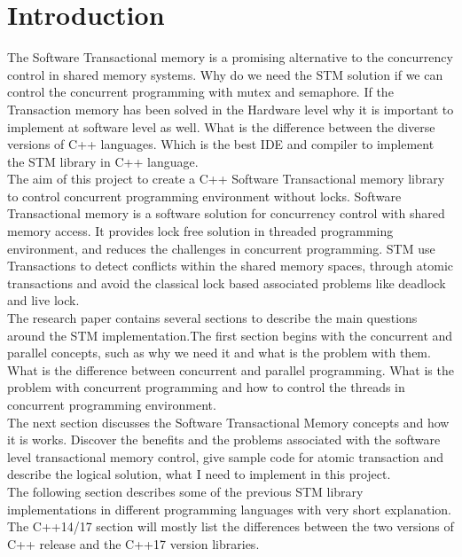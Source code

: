 \documentclass[12pt]{article}
\begin{document}
\section{Introduction}
The Software Transactional memory is a promising alternative to the concurrency control in shared memory systems. Why do we need the STM solution if we can control the concurrent programming with mutex and semaphore. If the Transaction memory has been solved in the Hardware level why it is important to implement at software level as well. What is the difference between the diverse versions of C++ languages. Which is the best IDE and compiler to implement the STM library in C++ language.\\

The aim of this project to create a C++ Software Transactional memory library to control concurrent programming environment without locks. Software Transactional memory is a software solution for concurrency control with shared memory access. It provides lock free solution in threaded programming environment, and reduces the challenges in concurrent programming. STM use Transactions to detect conflicts within the shared memory spaces, through atomic transactions and avoid the classical lock based associated problems like deadlock and live lock.\\

The research paper contains several sections to describe the main questions around the STM implementation.The first section begins with the concurrent and parallel concepts, such as why we need it and what is the problem with them. What is the difference between concurrent and parallel programming. What is the problem with concurrent programming and how to control the threads in concurrent programming environment.\\

The next section discusses the Software Transactional Memory concepts and how it is works. Discover the benefits and the problems associated with the software level transactional memory control, give sample code for atomic transaction and describe the logical solution, what I need to implement in this project.\\

The following section describes some of the previous STM library implementations in different programming languages with very short explanation.\\

The C++14/17 section will mostly list the differences between the two versions of C++ release and the C++17 version libraries.\\
\end{document}
